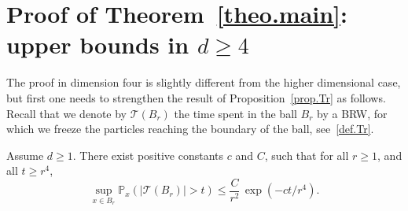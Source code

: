 \section{Proof of Theorem~\ref{theo.main}: upper bounds in \texorpdfstring{$d\ge 4$}{d4}}
\label{sec-UB4}

The proof in dimension four is slightly different from
the higher dimensional case, but first one needs
to strengthen the result of Proposition~\ref{prop.Tr} as follows.
Recall that we denote by $\mathcal T(B_r)$ the time spent in the ball $B_r$
by a BRW,
for which we freeze the particles reaching the
boundary of the ball, see~\eqref{def.Tr}.
\begin{proposition}\label{prop.Tr+}
Assume $d\ge 1$.
There exist positive constants $c$ and $C$, such that for all $r\ge 1$, and all $t\ge r^4$,\vspace*{-3pt}
\[
\sup_{x\in B_r} \mathbb P_x (|\mathcal T(B_r)|>t) \le \frac{C}{r^2}\, \exp(-ct/r^4).
\]
\end{proposition}
